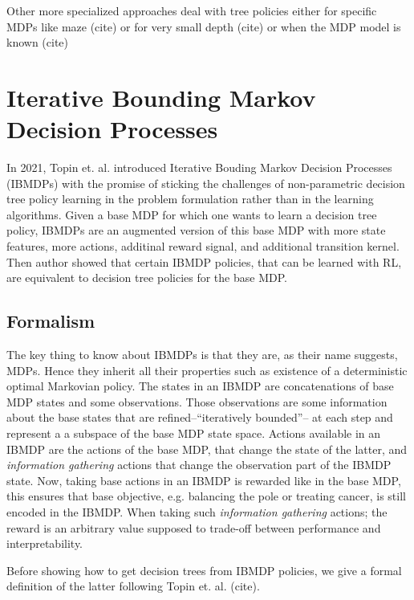 Other more specialized approaches deal with tree policies either for specific MDPs like maze (cite) or for very small depth (cite) or when the MDP model is known (cite)
\section{Iterative Bounding Markov Decision Processes}
In 2021, Topin et. al. introduced Iterative Bouding Markov Decision Processes (IBMDPs) with the promise of sticking the challenges of non-parametric decision tree policy learning in the problem formulation rather than in the learning algorithms.
Given a base MDP for which one wants to learn a decision tree policy, IBMDPs are an augmented version of this base MDP with more state features, more actions, additinal reward signal, and additional transition kernel.
Then author showed that certain IBMDP policies, that can be learned with RL, are equivalent to decision tree policies for the base MDP. 
\subsection{Formalism}
The key thing to know about IBMDPs is that they are, as their name suggests, MDPs. Hence they inherit all their properties such as existence of a deterministic optimal Markovian policy.
The states in an IBMDP are concatenations of base MDP states and some observations. Those observations are some information about the base states that are refined--``iteratively bounded''-- at each step and represent a a subspace of the base MDP state space.
Actions available in an IBMDP are the actions of the base MDP, that change the state of the latter, and \textit{information gathering} actions that change the observation part of the IBMDP state.
Now, taking base actions in an IBMDP is rewarded like in the base MDP, this ensures that base objective, e.g. balancing the pole or treating cancer, is still encoded in the IBMDP. When taking such \textit{information gathering} actions; the reward is an arbitrary value supposed to trade-off between performance and interpretability.
 
Before showing how to get decision trees from IBMDP policies, we give a formal definition of the latter following Topin et. al. (cite).

